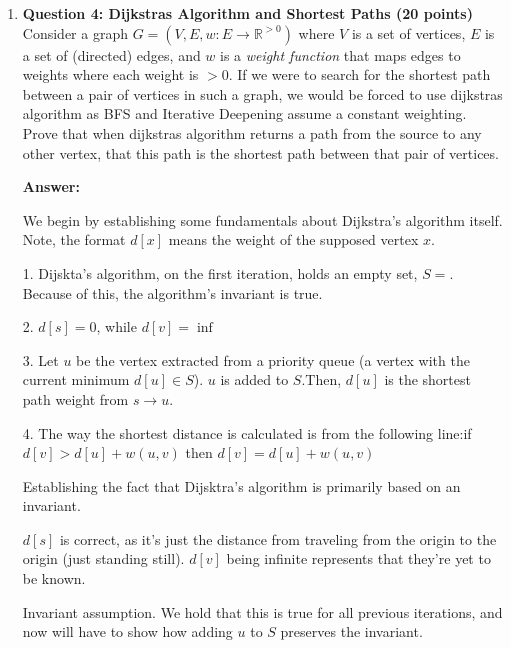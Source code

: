 \documentclass[11pt]{article}
\newenvironment{questions}
  {\begin{enumerate}}
  {\end{enumerate}}
\newcommand{\question}[1]{\item \textbf{#1}}
\newenvironment{answer}
  {\vspace{0.5em}\noindent\textbf{Answer:}\par}
  {\vspace{1em}}
\newenvironment{answercols}
  {\begin{multicols}{2}}
  {\end{multicols}}
\begin{document}
    \begin{questions}
        \question{Question 4: Dijkstras Algorithm and Shortest Paths (20 points)}
        Consider a graph $G = (V, E, w: E\rightarrow \mathbb{R}^{> 0})$ where $V$ is a set of vertices, $E$ is a set of (directed) edges, and $w$ is a \textit{weight function} that maps edges to weights where each weight is $> 0$. If we were to search for the shortest path between a pair of vertices in such a graph, we would be forced to use dijkstras algorithm as BFS and Iterative Deepening assume a constant weighting. Prove that when dijkstras algorithm returns a path from the source to any other vertex, that this path is the shortest path between that pair of vertices.\newline

        \begin{answer}
            We begin by establishing some fundamentals about Dijkstra’s algorithm itself. Note, the format $d[x]$ means the weight of the supposed vertex $x$.

            \begin{answercols}
                1. Dijskta’s algorithm, on the first iteration, holds an empty set, $S={}$. Because of this, the algorithm’s invariant is true.

                2. $d[s]=0$, while $d[v]=\inf$

                3. Let $u$ be the vertex extracted from a priority queue (a vertex with the current minimum $d[u] \in S$). $u$ is added to $S$.\newline\newline Then, $d[u]$ is the shortest path weight from $s \to u$.
            
                4. The way the shortest distance is calculated is from the following line:\newline\newline if $d[v]>d[u]+w(u, v)$ then $d[v]=d[u]+w(u,v)$

                \columnbreak

                Establishing the fact that Dijsktra’s algorithm is primarily based on an invariant.
                
                $d[s]$ is correct, as it’s just the distance from traveling from the origin to the origin (just standing still). $d[v]$ being infinite represents that they’re yet to be known.

                Invariant assumption. We hold that this is true for all previous iterations, and now will have to show how adding $u$ to $S$ preserves the invariant.


\end{answercols}
\end{answer}
\end{questions}
\end{document}
